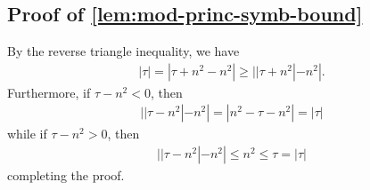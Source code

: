 \documentclass[12pt,reqno]{amsart}
\numberwithin{equation}{section}  %
\numberwithin{figure}{section}
\theoremstyle{plain}
\theoremstyle{definition}
\theoremstyle{remark}
\begin{document}
\subsection{Proof of \autoref{lem:mod-princ-symb-bound}} 
\label{ssec:pf-mod-princ}
By the reverse triangle inequality, we have
%
%
\begin{equation*}
\begin{split}
  | \tau | = | \tau + n^{2} - n^{2} | \ge | | \tau + n^{2} | - n^{2} |.
\end{split}
\end{equation*}
%
%
Furthermore, if $\tau - n^{2} < 0$, then
%
%
\begin{equation*}
\begin{split}
  | | \tau - n^{2} | - n^{2} | = | n^{2} - \tau - n^{2} | = | \tau |
\end{split}
\end{equation*}
%
%
while if $\tau - n^{2} > 0$, then
%
%
\begin{equation*}
\begin{split}
  | | \tau - n^{2} | - n^{2} | \le n^{2} \le \tau = |\tau|
\end{split}
\end{equation*}
%
%
completing the proof. \qquad \qedsymbol
%
%


%
%
%
\begin{bibdiv}
\begin{biblist}


\end{biblist}
\end{bibdiv}
\end{document}
